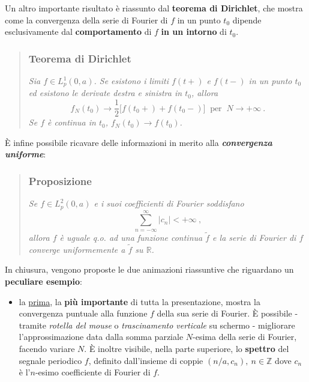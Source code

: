 \documentclass[
]{book}
\providecommand{\tightlist}{%
  \setlength{\itemsep}{0pt}\setlength{\parskip}{0pt}}
\begin{document}
Un altro importante risultato è riassunto dal \textbf{teorema di Dirichlet}, che mostra come la convergenza della serie di Fourier di \(f\) in un punto \(t_0\) dipende esclusivamente dal \textbf{comportamento} di \(f\) \textbf{in un intorno} di \(t_0\).

\begin{quote}
\hypertarget{teorema-di-dirichlet}{%
\subsubsection*{Teorema di Dirichlet}\label{teorema-di-dirichlet}}

\emph{Sia \(f \in L^1_p(0,a)\). Se esistono i limiti \(f(t+)\) e \(f(t-)\) in un punto \(t_0\) ed esistono le derivate destra e sinistra in \(t_0\), allora}
\[f_N(t_0) \rightarrow \frac{1}{2} \big[ f(t_0+) + f(t_0-) \big] \ \text{ per } \ N \rightarrow +\infty \ .\]
\emph{Se \(f\) è continua in \(t_0\), \(f_N(t_0) \rightarrow f(t_0)\).}
\end{quote}

È infine possibile ricavare delle informazioni in merito alla \emph{\textbf{convergenza uniforme}}:

\begin{quote}
\hypertarget{proposizione}{%
\subsubsection*{Proposizione}\label{proposizione}}

\emph{Se \(f \in L^2_p(0,a)\) e i suoi coefficienti di Fourier soddisfano}
\[ \sum_{n=-\infty}^{\infty} |c_n| < + \infty \ ,\]
\emph{allora \(f\) è uguale q.o. ad una funzione continua \(\tilde f\) e la serie di Fourier di \(f\) converge uniformemente a \(\tilde f\) su \(\mathbb{R}\).}
\end{quote}

In chiusura, vengono proposte le due animazioni riassuntive che riguardano un \textbf{peculiare esempio}:

\begin{itemize}
\tightlist
\item
  la \href{https://bradwave.github.io/thesis/\#/serie-di-fourier}{prima}, la \textbf{più importante} di tutta la presentazione, mostra la convergenza puntuale alla funzione \(f\) della sua serie di Fourier. È possibile - tramite \emph{rotella del mouse} o \emph{trascinamento verticale} su schermo - migliorare l'approssimazione data dalla somma parziale \(N\)-esima della serie di Fourier, facendo variare \(N\). È inoltre visibile, nella parte superiore, lo \textbf{spettro} del segnale periodico \(f\), definito dall'insieme di coppie \((n/a,c_n), \ n \in \mathbb{Z}\) dove \(c_n\) è l'\(n\)-esimo coefficiente di Fourier di \(f\).
\end{itemize}
\end{document}
